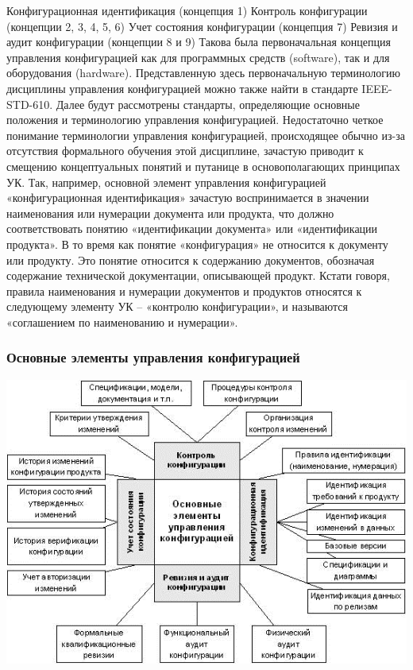 \documentclass{../industrial-development}
\begin{document}
Конфигурационная идентификация (концепция 1)
Контроль конфигурации (концепции 2, 3, 4, 5, 6)
Учет состояния конфигурации (концепция 7)
Ревизия и аудит конфигурации (концепции 8 и 9)
Такова была первоначальная концепция управления конфигурацией как для программных средств (software), так и для оборудования (hardware). Представленную здесь первоначальную терминологию дисциплины управления конфигурацией можно также найти в стандарте IEEE-STD-610. Далее будут рассмотрены стандарты, определяющие основные положения и терминологию управления конфигурацией.
Недостаточно четкое понимание терминологии управления конфигурацией, происходящее обычно из-за отсутствия формального обучения этой дисциплине, зачастую приводит к смещению концептуальных понятий и путанице в основополагающих принципах УК.
Так, например, основной элемент управления конфигурацией «конфигурационная идентификация» зачастую воспринимается в значении наименования или нумерации документа или продукта, что должно соответствовать понятию «идентификации документа» или «идентификации продукта». В то время как понятие «конфигурация» не относится к документу или продукту. Это понятие относится к содержанию документов, обозначая содержание технической документации, описывающей продукт. Кстати говоря, правила наименования и нумерации документов и продуктов относятся к следующему элементу УК – «контролю конфигурации», и называются «соглашением по наименованию и нумерации».
~\cite{Projects}
\begin{frame} \frametitle{Основные элементы управления конфигурацией}
 \includegraphics[width=\textwidth]{cmelements.png}
 \begin{block}{}
  
 \end{block}
\end{frame}
\end{document}
